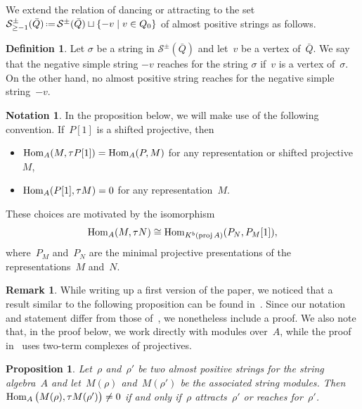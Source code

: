 \documentclass{amsart}
\newtheorem{proposition}[theorem]{Proposition}
\theoremstyle{definition}
\newtheorem{definition}[theorem]{Definition}
\newtheorem{remark}[theorem]{Remark}
\newtheorem{notation}[theorem]{Notation}
\newcommand{\set}[2]{\left\{ #1 \;\middle|\; #2 \right\}} %
\newcommand{\eqdef}{\mbox{\,\raisebox{0.2ex}{\scriptsize\ensuremath{\mathrm:}}\ensuremath{=}\,}} %
\newcommand{\strings}{\mathcal{S}} %
\newcommand{\Hom}[1]{\operatorname{{\rm Hom}}_{#1}}
\begin{document}
We extend the relation of dancing or attracting to the set~$\strings^\pm_{\ge -1}(\bar Q) \eqdef \strings^\pm(\bar Q) \sqcup \set{-v}{v \in Q_0}$ of almost positive strings as follows.

\begin{definition}
\label{def:negativeSimpleDance}
Let $\sigma$ be a string in $\strings^\pm(\bar Q)$ and let~$v$ be a vertex of~$\bar Q$.
We say that the negative simple string $-v$ reaches for the string $\sigma$ if~$v$ is a vertex of~$\sigma$.
On the other hand, no almost positive string reaches for the negative simple string~$-v$.
\end{definition}

\begin{notation}
\label{not:explanationNegativeSimpleDance}
In the proposition below, we will make use of the following convention.
If~$P[1]$ is a shifted projective, then 
\begin{itemize}
\item $\Hom{A} (M, \tau P[1]) = \Hom{A} (P,M)$ for any representation or shifted projective~$M$,
\item $\Hom{A} (P[1], \tau M) = 0$ for any representation~$M$.
\end{itemize}
These choices are motivated by the isomorphism
\[
\Hom{A} (M, \tau N) \cong \Hom{K^b(\operatorname{proj} A)}(P_N, P_M[1]),
\]
where~$P_M$ and~$P_N$ are the minimal projective presentations of the representations~$M$ and~$N$.
\end{notation}

\begin{remark}
While writing up a first version of the paper, we noticed that a result similar to the following proposition can be found in~\cite{EiseleJanssensRaedschelders}. 
Since our notation and statement differ from those of~\cite{EiseleJanssensRaedschelders}, we nonetheless include a proof. We also note that, in the proof below, we work directly with modules over~$A$, while the proof in~\cite{EiseleJanssensRaedschelders} uses two-term complexes of projectives.
\end{remark}

\begin{proposition}
\label{proposition: attract or dance and tau compatibility}
Let~$\rho$ and~$\rho'$ be two almost positive strings for the string algebra~$A$ and let~$M(\rho)$ and~$M(\rho')$ be the associated string modules.
Then~$\Hom{A} \big( M(\rho), \tau M(\rho') \big) \ne 0$ if and only if~$\rho$ attracts~$\rho'$ or reaches for~$\rho'$.
\end{proposition}
\end{document}
